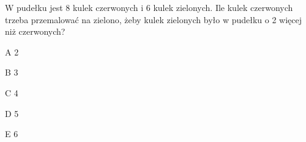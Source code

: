 \begin{tresc}
W pudełku jest 8 kulek czerwonych i 6 kulek zielonych. Ile kulek czerwonych trzeba przemalować na zielono, żeby kulek zielonych było w pudełku o 2 więcej niż czerwonych?
\end{tresc}
\begin{wariant}{A} 2 \end{wariant}
\begin{wariant}{B} 3 \end{wariant}
\begin{wariant}{C} 4 \end{wariant}
\begin{wariant}{D} 5 \end{wariant}
\begin{wariant}{E} 6 \end{wariant}
